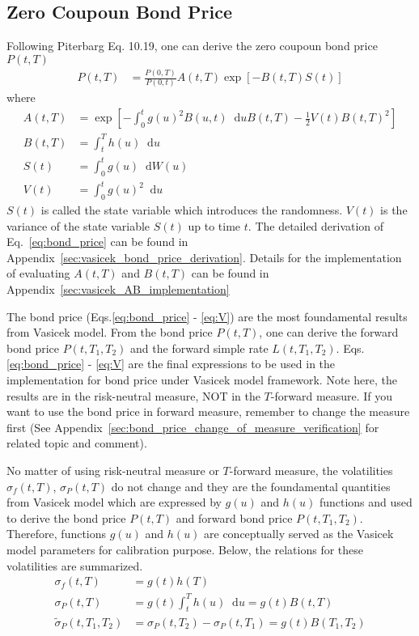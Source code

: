 \documentclass[12pt]{article}
\newcommand{\dd}{\mathop{}\!\text{d}}
\newcommand{\qBrownian}[1]{W(#1)}
\newcommand{\sigmaP}{\sigma_P}
\newcommand{\sigmaFP}{\tilde{\sigma}_P}
\newcommand{\sigmaf}{\sigma_f}
\newcommand{\piterbargEq}[1]{Piterbarg Eq. #1}
\begin{document}
\subsection{Zero Coupoun Bond Price}
Following \piterbargEq{10.19}, one can derive the zero coupoun bond price $P(t,T)$
\begin{align}
    \label{eq:bond_price}
    P(t, T) &=\frac{P(0, T)}{P(0, t)} A(t,T) \exp\left[-B(t,T) S(t)\right]
\end{align}
where
\begin{align}
    \label{eq:A}
    A(t, T) &=\exp \left[
        -\int_0^t g(u)^2 B(u, t) \dd u B(t,T) - \frac{1}{2} V(t) B(t, T)^2 
    \right] \\
    \label{eq:B}
    B(t, T) &= \int_t^T h(u) \dd u \\
    \label{eq:S}
    S(t) &= \int_0^t g(u) \dd \qBrownian{u} \\
    \label{eq:V}
    V(t) &= \int_0^t g(u)^2 \dd u
\end{align}
$S(t)$ is called the state variable which introduces
the randomness. $V(t)$ is the variance of the state variable $S(t)$ up to time $t$.
The detailed derivation of Eq.~\ref{eq:bond_price}
can be found in Appendix~\ref{sec:vasicek_bond_price_derivation}.
Details for the implementation of evaluating $A(t, T)$ and $B(t, T)$
can be found in Appendix~\ref{sec:vasicek_AB_implementation}

The bond price (Eqs.\ref{eq:bond_price} - \ref{eq:V})
are the most foundamental results from Vasicek model.
From the bond price $P(t, T)$, one can derive the forward bond price
$P(t, T_1, T_2)$ and the forward simple rate $L(t, T_1, T_2)$.
Eqs.\ref{eq:bond_price} - \ref{eq:V} are the final expressions to be used
in the implementation for bond price under Vasicek model framework.
{\color{red}
Note here, the results are in the risk-neutral measure,
NOT in the $T$-forward measure.}
If you want to use the bond price in forward measure, remember to change
the measure first (See Appendix~\ref{sec:bond_price_change_of_measure_verification}
for related topic and comment).

No matter of using risk-neutral measure or $T$-forward measure,
the volatilities $\sigmaf(t,T)$, $\sigmaP(t,T)$ do not change and
they are the foundamental quantities from Vasicek model which are 
expressed by $g(u)$ and $h(u)$ functions and used to derive the bond price $P(t, T)$ and
forward bond price $P(t, T_1, T_2)$. Therefore, functions $g(u)$ and $h(u)$ are conceptually
served as the Vasicek model parameters for calibration purpose.
Below, the relations for these volatilities are summarized.
\begin{align}
    \sigmaf(t, T) &= g(t) h(T) \\
    \nonumber
    \sigmaP(t, T) & = g(t) \int_t^T h(u) \dd u = g(t) B(t, T) \\
    \sigmaFP(t, T_1, T_2) &= \sigmaP(t, T_2) - \sigmaP(t, T_1) = g(t) B(T_1, T_2)
\end{align}
\end{document}
